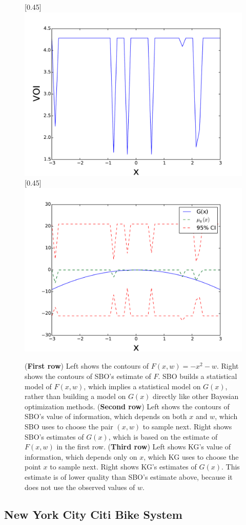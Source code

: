 \documentclass{article}
\newcommand{\w}{w}
\begin{document}
\begin{figure}[!htb]
  [0.45\linewidth]{
      \includegraphics[width=0.44\linewidth]{9prior10VoiStandardGaussianSeed100samples100.pdf}
  }
  \quad
  [0.45\linewidth]{
      \includegraphics[width=0.44\linewidth]{8prior10StandardGaussianSeed100samples100.pdf}
  }
\caption{
    ({\bf First row}) Left shows the contours of $F\left(x,\w\right)=-x^{2}-\w$.  Right shows the contours of SBO's estimate of $F$.  SBO builds a statistical model of $F(x,\w)$, which implies a statistical model on $G(x)$, rather than building a model on $G(x)$ directly like other Bayesian optimization methods.
    ({\bf Second row}) Left shows the contours of SBO's value of information, which depends on both $x$ and $\w$, which SBO uses to choose the pair $(x,\w)$ to sample next.  Right shows SBO's estimates of $G(x)$, which is based on the estimate of $F(x,\w)$ in the first row.
    ({\bf Third row}) Left shows KG's value of information, which depends only on $x$, which KG uses to choose the point $x$ to sample next.  Right shows KG's estimates of $G(x)$.  This estimate is of lower quality than SBO's estimate above, because it does not use the observed values of $\w$.
\label{fig:tahi10}}
\end{figure} 

\subsection{New York City Citi Bike System}
\label{sec:citibike}
\end{document}
